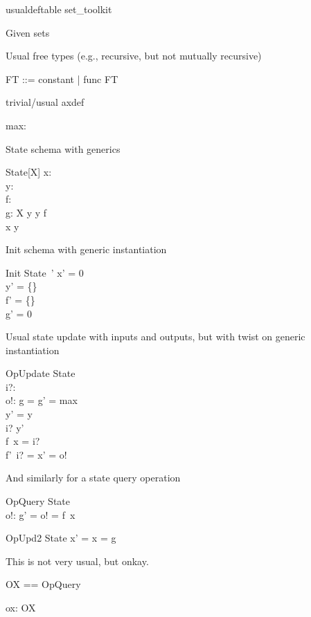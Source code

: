 \documentclass{article}
\begin{document}
\begin{zsection}
\SECTION usualdeftable \parents set\_toolkit
\end{zsection}

Given sets
\begin{zed}
   [G, H]
\end{zed}

Usual free types (e.g., recursive, but not mutually recursive)
\begin{zed}
   FT ::= constant | func \ldata \nat \cross FT \rdata
\end{zed}

trivial/usual axdef
\begin{axdef}
   max: \nat
\end{axdef}

State schema with generics
\begin{schema}{State}[X]
   x: \nat \\
   y: \power~\nat \\
   f: \nat \fun \nat \\
   g: X
\where
   y \cross y \subseteq f \\
   x \in y
\end{schema}

Init schema with generic instantiation
\begin{schema}{Init}
   State~'
\where
   x' = 0 \\
   y' = \{\} \\
   f' = \{\} \\
   g' = 0
\end{schema}

Usual state update with inputs and outputs, but with twist on generic instantiation
\begin{schema}{OpUpdate}
   \Delta State \\
   i?: \nat \\
   o!: \nat
\where
   g = g' = max \\ %
   y' = y \\
   i? \in y' \\
   f~x = i? \\
   f'~i? = x' = o!
\end{schema}

And similarly for a state query operation
\begin{schema}{OpQuery}
  \Xi State \\
  o!: \nat
\where
   g' = o! = f~x
\end{schema}

\begin{schema}{OpUpd2}
   \Delta State
\where
    x' = x = g \\
\end{schema}

This is not very usual, but onkay.
\begin{zed}
   OX == \pre OpQuery
\end{zed}

\begin{axdef}
   ox: OX
\end{axdef}
\end{document}
